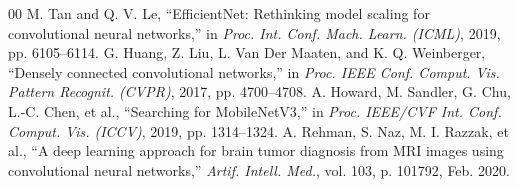 \documentclass[conference]{IEEEtran}
\begin{document}
\begin{thebibliography}{00}
 M. Tan and Q. V. Le, ``EfficientNet: Rethinking model scaling for convolutional neural networks,'' in \emph{Proc. Int. Conf. Mach. Learn. (ICML)}, 2019, pp. 6105--6114.
 G. Huang, Z. Liu, L. Van Der Maaten, and K. Q. Weinberger, ``Densely connected convolutional networks,'' in \emph{Proc. IEEE Conf. Comput. Vis. Pattern Recognit. (CVPR)}, 2017, pp. 4700--4708.
 A. Howard, M. Sandler, G. Chu, L.-C. Chen, et al., ``Searching for MobileNetV3,'' in \emph{Proc. IEEE/CVF Int. Conf. Comput. Vis. (ICCV)}, 2019, pp. 1314--1324.
 A. Rehman, S. Naz, M. I. Razzak, et al., ``A deep learning approach for brain tumor diagnosis from MRI images using convolutional neural networks,'' \emph{Artif. Intell. Med.}, vol. 103, p. 101792, Feb. 2020.
\end{thebibliography}
\end{document}
